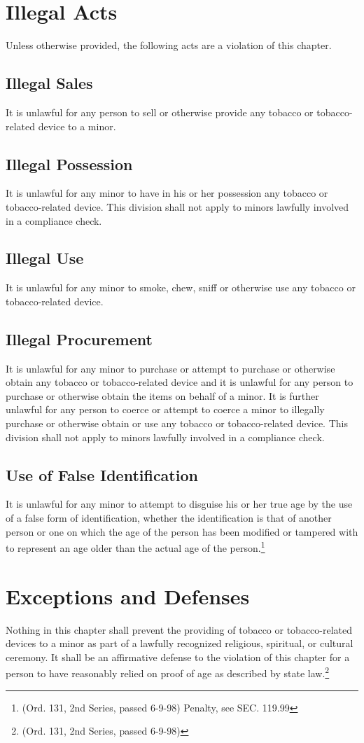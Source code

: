 \section{Illegal Acts}
Unless otherwise provided, the following acts are a violation of this chapter.
\subsection{Illegal Sales}
It is unlawful for any person to sell or otherwise provide any tobacco or tobacco-related device to a minor.
\subsection{Illegal Possession}
It is unlawful for any minor to have in his or her possession any tobacco or tobacco-related device. This division shall not apply to minors lawfully involved in a compliance check.
\subsection{Illegal Use}
It is unlawful for any minor to smoke, chew, sniff or otherwise use any tobacco or tobacco-related device.
\subsection{Illegal Procurement}
It is unlawful for any minor to purchase or attempt to purchase or otherwise obtain any tobacco or tobacco-related device and it is unlawful for any person to purchase or otherwise obtain the items on behalf of a minor.  It is further unlawful for any person to coerce or attempt to coerce a minor to illegally purchase or otherwise obtain or use any tobacco or tobacco-related device.  This division shall not apply to minors lawfully involved in a compliance check.
\subsection{Use of False Identification}
It is unlawful for any minor to attempt to disguise his or her true age by the use of a false form of identification, whether the identification is that of another person or one on which the age of the person has been modified or tampered with to represent an age older than the actual age of the person.\footnote{(Ord. 131, 2nd Series, passed 6-9-98)  Penalty, see SEC. 119.99}
\section{Exceptions and Defenses}
Nothing in this chapter shall prevent the providing of tobacco or tobacco-related devices to a minor as part of a lawfully recognized religious, spiritual, or cultural ceremony.  It shall be an affirmative defense to the violation of this chapter for a person to have reasonably relied on proof of age as described by state law.\footnote{(Ord. 131, 2nd Series, passed 6-9-98)}
